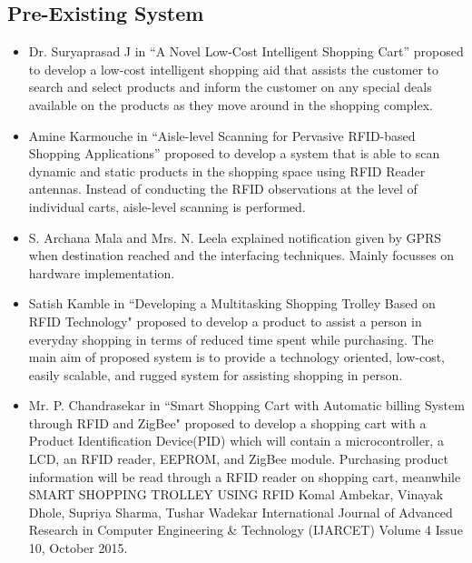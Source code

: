 \documentclass[12pt]{article}
\begin{document}
\subsection{Pre-Existing System}
\begin{itemize}
\item Dr. Suryaprasad J in “A Novel Low-Cost Intelligent Shopping Cart” proposed to develop a low-cost intelligent shopping aid that assists the customer to search and select products and inform the customer on any special deals available on the products as they move around in the shopping complex. 
\item Amine Karmouche in “Aisle-level Scanning for Pervasive RFID-based Shopping Applications” proposed to develop a system that is able to scan dynamic and static products in the shopping space using RFID Reader antennas. Instead of conducting the RFID observations at the level of individual carts, aisle-level scanning is performed.
\item S. Archana Mala and Mrs. N. Leela explained notification given by GPRS when destination reached and the interfacing techniques. Mainly focusses on hardware implementation.
\item Satish Kamble in “Developing a Multitasking Shopping Trolley Based on RFID Technology" proposed to develop a product to assist a person in everyday shopping in terms of reduced time spent while purchasing. The main aim of proposed system is to provide a technology oriented, low-cost, easily scalable, and rugged system for assisting shopping in person.
\item Mr. P. Chandrasekar in “Smart Shopping Cart with Automatic billing System through RFID and ZigBee" proposed to develop a shopping cart with a Product Identification Device(PID) which will contain a microcontroller, a LCD, an RFID reader, EEPROM, and ZigBee module. Purchasing product information will be read through a RFID reader on shopping cart, meanwhile SMART SHOPPING TROLLEY USING RFID Komal Ambekar, Vinayak Dhole, Supriya Sharma, Tushar Wadekar International Journal of Advanced Research in Computer Engineering \& Technology (IJARCET) Volume 4 Issue 10, October 2015.
\end{itemize}
\end{document}
